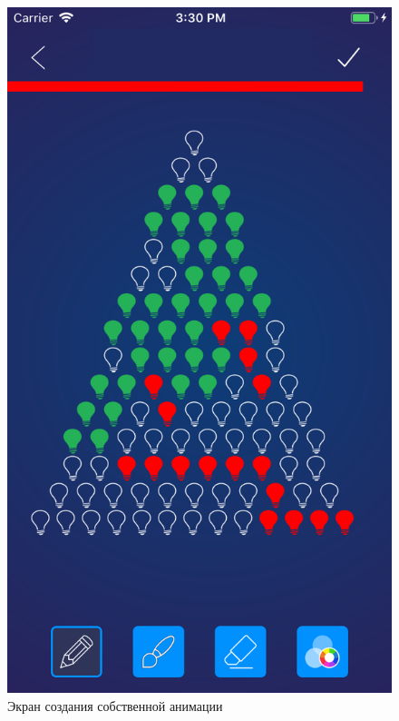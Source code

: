 \begin{figure}[H]
\centering
	\includegraphics[scale=0.2]{figures/userGuide/drawingCustom.png}
	\caption{Экран создания собственной анимации}
	\label{fig:develop:userGuide:drawingCustom}
\end{figure}
~
